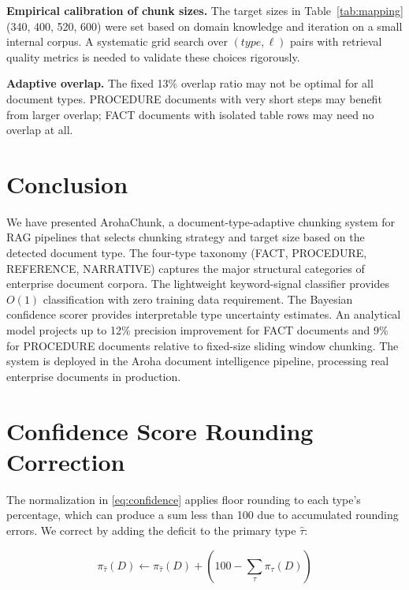 \documentclass[conference]{IEEEtran}
\begin{document}
\textbf{Empirical calibration of chunk sizes.} The target
sizes in Table~\ref{tab:mapping} (340, 400, 520, 600) were
set based on domain knowledge and iteration on a small
internal corpus. A systematic grid search over $(type,
\ell)$ pairs with retrieval quality metrics is needed to
validate these choices rigorously.

\textbf{Adaptive overlap.} The fixed 13\% overlap ratio
may not be optimal for all document types. PROCEDURE
documents with very short steps may benefit from larger
overlap; FACT documents with isolated table rows may need
no overlap at all.

\section{Conclusion}
\label{sec:conclusion}

We have presented ArohaChunk, a document-type-adaptive
chunking system for RAG pipelines that selects chunking
strategy and target size based on the detected document
type. The four-type taxonomy (FACT, PROCEDURE, REFERENCE,
NARRATIVE) captures the major structural categories of
enterprise document corpora. The lightweight keyword-signal
classifier provides $O(1)$ classification with zero
training data requirement. The Bayesian confidence scorer
provides interpretable type uncertainty estimates. An
analytical model projects up to 12\% precision improvement
for FACT documents and 9\% for PROCEDURE documents relative
to fixed-size sliding window chunking. The system is deployed
in the Aroha document intelligence pipeline, processing
real enterprise documents in production.




\appendix

\section{Confidence Score Rounding Correction}
\label{app:rounding}

The normalization in \eqref{eq:confidence} applies floor
rounding to each type's percentage, which can produce a
sum less than 100 due to accumulated rounding errors.
We correct by adding the deficit to the primary type
$\hat\tau$:

\begin{equation}
  \pi_{\hat\tau}(D) \leftarrow \pi_{\hat\tau}(D) +
    \left(100 - \sum_\tau \pi_\tau(D)\right)
  \label{eq:rounding_fix}
\end{equation}
\end{document}
